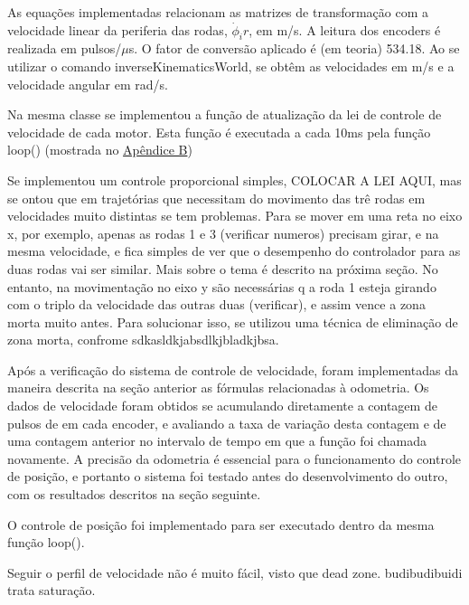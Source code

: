 As equações implementadas relacionam as matrizes de transformação com a velocidade linear da periferia das rodas, $\dot{\phi}_i r$, em m/s. A leitura dos encoders é realizada em pulsos/$\mu$s. O fator de conversão aplicado é (em teoria) 534.18. Ao se utilizar o comando inverseKinematicsWorld, se obtêm as velocidades em m/s e a velocidade angular em rad/s.


Na mesma classe se implementou a função de atualização da lei de controle de velocidade de cada motor. Esta função é executada a cada 10ms pela função loop() (mostrada no \hyperref[sec:custo]{Apêndice B})

Se implementou um controle proporcional simples, COLOCAR A LEI AQUI, mas se ontou que em trajetórias que necessitam do movimento das trê rodas em velocidades muito distintas se tem problemas. Para se mover em uma reta no eixo x, por exemplo, apenas as rodas 1 e 3 (verificar numeros) precisam girar, e na mesma velocidade, e fica simples de ver que o desempenho do controlador para as duas rodas vai ser similar. Mais sobre o tema é descrito na próxima seção. No entanto, na movimentação no eixo y são necessárias q a roda 1 esteja girando com o triplo da velocidade das outras duas (verificar), e assim vence a zona morta muito antes. Para solucionar isso, se utilizou uma técnica de eliminação de zona morta, confrome sdkasldkjabsdlkjbladkjbsa.

Após a verificação do sistema de controle de velocidade, foram implementadas da maneira descrita na seção anterior as fórmulas relacionadas à odometria. Os dados de velocidade foram obtidos se acumulando diretamente a contagem de pulsos de em cada encoder, e avaliando a taxa de variação desta contagem e de uma contagem anterior no intervalo de tempo em que a função foi chamada novamente. A precisão da odometria é essencial para o funcionamento do controle de posição, e portanto o sistema foi testado antes do desenvolvimento do outro, com os resultados descritos na seção seguinte.

O controle de posição foi implementado para ser executado dentro da mesma função loop().

Seguir o perfil de velocidade não é muito fácil, visto que dead zone. budibudibuidi \citet{indiveri2009swedish} trata saturação.

